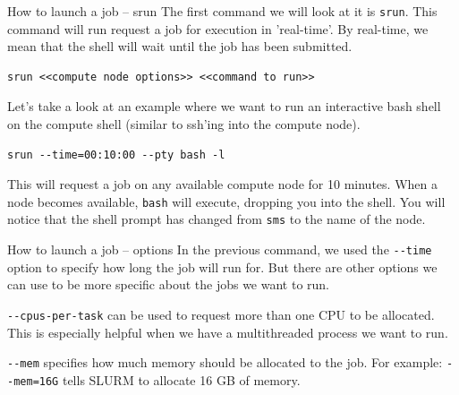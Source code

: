 \documentclass[10pt]{beamer}
\begin{document}
\begin{frame}[label={sec:org4d33486},fragile]{How to launch a job -- srun}
 The first command we will look at it is \texttt{srun}. This command will run request a
job for execution in 'real-time'. By real-time, we mean that the shell will wait
until the job has been submitted.

\begin{verbatim}
srun <<compute node options>> <<command to run>>
\end{verbatim}

Let's take a look at an example where we want to run an interactive bash shell
on the compute shell (similar to ssh'ing into the compute node).

\begin{verbatim}
srun --time=00:10:00 --pty bash -l
\end{verbatim}

This will request a job on any available compute node for 10 minutes. When a
node becomes available, \texttt{bash} will execute, dropping you into the shell. You will
notice that the shell prompt has changed from \texttt{sms} to the name of the node.
\end{frame}

\begin{frame}[label={sec:orgeae5aa4},fragile]{How to launch a job -- options}
 In the previous command, we used the \texttt{-{}-time} option to specify how long the job
will run for. But there are other options we can use to be more specific about
the jobs we want to run.

\texttt{-{}-cpus-per-task} can be used to request more than one CPU to be
allocated. This is especially helpful when we have a multithreaded process we
want to run.

\texttt{-{}-mem} specifies how much memory should be allocated to the job. For example:
\texttt{-{}-mem=16G} tells SLURM to allocate 16 GB of memory.
\end{frame}
\end{document}
